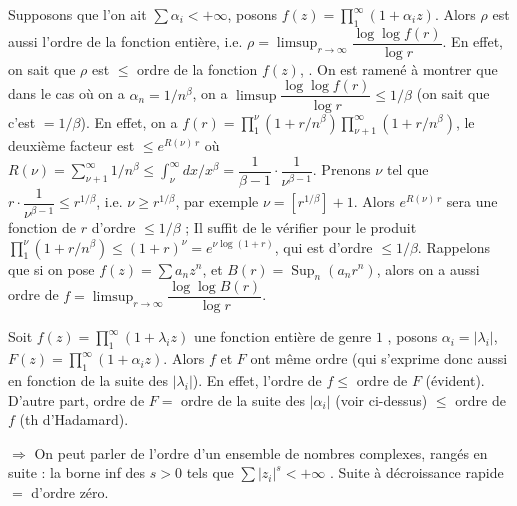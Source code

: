 \documentclass[11pt,a4paper]{article}
\begin{document}
\ill{} Supposons que l'on ait $\sum \alpha_i < +\infty$, posons $f(z) = \prod_1^{\infty} (1 + \alpha_i z)$. Alors $\rho$ est aussi l'ordre de la fonction entière, i.e. $\rho = \limsup_{r \to \infty} \dfrac{\log\log f(r)}{\log r}$. \ill{} En effet, on sait que $\rho$ est $\leq$ ordre de la fonction $f(z)$, \struck{\ill{}} \ill{} . On est ramené à montrer que  dans le cas où on a $\alpha_n = 1/n^\beta$, on a $\limsup \dfrac{\log\log f(r)}{\log r} \leq 1/\beta$ (on sait \ill{} que c'est $= 1/\beta$). En effet, on a $f(r) = \prod_1^{\nu} (1 + r/n^\beta) \prod_{\nu+1}^{\infty} (1 + r/n^\beta)$, le deuxième facteur est $\leq e^{R(\nu)\, r}$ où $R(\nu) = \sum_{\nu+1}^{\infty} 1/n^\beta \leq \int_\nu^{\infty} dx/x^\beta = \dfrac{1}{\beta - 1}\cdot\dfrac{1}{\nu^{\beta-1}}$. Prenons $\nu$ tel que $r \cdot \dfrac{1}{\nu^{\beta-1}} \leq r^{1/\beta}$, i.e. $\nu \geq r^{1/\beta}$, par exemple $\nu = [r^{1/\beta}] + 1$. Alors $e^{R(\nu)\, r}$ sera une fonction de $r$ d'ordre $\leq 1/\beta$ ; Il suffit de le vérifier pour le produit
 $\prod_1^{\nu} (1 + r/n^\beta) \leq (1 + r)^\nu = e^{\nu \log(1+r)}$, qui est  d'ordre $\leq 1/\beta$. Rappelons que si on pose $f(z) = \sum a_n z^n$, \struck{\ill{}} et $B(r) = \operatorname{Sup}_n (a_n r^n)$, alors on a aussi ordre de $f = \limsup_{r \to \infty} \dfrac{\log\log B(r)}{\log r}$.

Soit $f(z) = \prod_1^{\infty} (1 + \lambda_i z)$ une fonction entière de genre $1$ , posons $\alpha_i = |\lambda_i|$, $F(z) = \prod_1^{\infty} (1 + \alpha_i z)$. Alors $f$ et $F$ ont même ordre (qui s'exprime donc aussi en fonction de la suite des $|\lambda_i|$). En effet, l'ordre de $f \leq$ ordre de $F$ (évident). D'autre part, ordre de $F =$ ordre de la suite des $|\alpha_i|$ (voir ci-dessus) $\leq$ ordre de $f$ (th d'Hadamard).

$\Longrightarrow$ On peut parler de l'ordre d'un ensemble  de nombres complexes,  \ill{}  rangés en suite :  la borne inf des $s > 0$ tels que $\sum |z_i|^s < +\infty$ . Suite à décroissance rapide $=$ d'ordre zéro.
\end{document}
